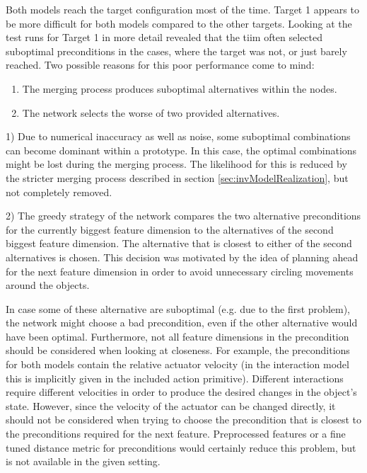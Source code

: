 Both models reach the target configuration most of the time. Target 1 appears to be more difficult for both models compared to the other targets. 
Looking at the test runs for Target 1 in more detail revealed that the \gls{tiim} often selected suboptimal preconditions in the cases, where the target was not, or just barely reached.
Two possible reasons for this poor performance come to mind:
\begin{enumerate}
\item The merging process produces suboptimal alternatives within the nodes.
\item The network selects the worse of two provided alternatives.
\end{enumerate}

1) Due to numerical inaccuracy as well as noise, some suboptimal combinations can become dominant within a prototype. In this case, the optimal combinations might be lost during the merging process. The likelihood for this is reduced by the stricter merging process described in section \ref{sec:invModelRealization}, but not completely removed.

2) The greedy strategy of the network compares the two alternative preconditions for the currently biggest feature dimension to the alternatives of the second biggest feature dimension. The alternative that is closest to either of the second alternatives is chosen. This decision was motivated by the idea of planning ahead for the next feature dimension in order to avoid unnecessary circling movements around the objects.

In case some of these alternative are suboptimal (e.g. due to the first problem), the network might choose a bad precondition, even if the other alternative would have been optimal. 
Furthermore, not all feature dimensions in the precondition should be considered when looking at closeness. For example, the preconditions for both models contain the relative actuator velocity (in the interaction model this is implicitly given in the included action primitive). 
Different interactions require different velocities in order to produce the desired changes in the object's state. 
However, since the velocity of the actuator can be changed directly, it should not be considered when trying to choose the precondition that is closest to the preconditions required for the next feature. Preprocessed features or a fine tuned distance metric for preconditions would certainly reduce this problem, but is not available in the given setting.

